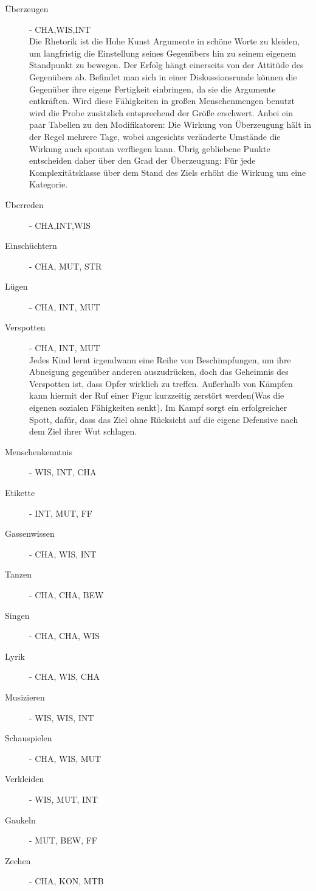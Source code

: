 \documentclass[a4paper,12pt,oneside]{book}
\begin{document}
\begin{description}
\item[Überzeugen]- CHA,WIS,INT
\\Die Rhetorik ist die Hohe Kunst Argumente in schöne Worte zu kleiden, um langfristig die Einstellung seines Gegenübers hin zu seinem eigenem Standpunkt zu bewegen. Der Erfolg hängt einerseits von der Attitüde des Gegenübers ab. Befindet man sich in einer Diskussionsrunde können die Gegenüber ihre eigene Fertigkeit einbringen, da sie die Argumente entkräften. Wird diese Fähigkeiten in großen Menschenmengen benutzt wird die Probe zusätzlich entsprechend der Größe erschwert. Anbei ein paar Tabellen zu den Modifikatoren:
Die Wirkung von Überzeugung hält in der Regel mehrere Tage, wobei angesichts veränderte Umstände die Wirkung auch spontan verfliegen kann. Übrig gebliebene Punkte entscheiden daher über den Grad der Überzeugung:
Für jede Komplexitätsklasse über dem Stand des Ziels erhöht die Wirkung um eine Kategorie.
\item[Überreden]- CHA,INT,WIS
\item[Einschüchtern]- CHA, MUT, STR
\item[Lügen]- CHA, INT, MUT
\item[Verspotten]- CHA, INT, MUT
\\Jedes Kind lernt irgendwann eine Reihe von Beschimpfungen, um ihre Abneigung gegenüber anderen auszudrücken, doch das Geheimnis des Verspotten ist, dass Opfer wirklich zu treffen. Außerhalb von Kämpfen kann hiermit der Ruf einer Figur kurzzeitig zerstört werden(Was die eigenen sozialen Fähigkeiten senkt). Im Kampf sorgt ein erfolgreicher Spott, dafür, dass das Ziel ohne Rücksicht auf die eigene Defensive nach dem Ziel ihrer Wut schlagen. 
\item[Menschenkenntnis]- WIS, INT, CHA
\item[Etikette]- INT, MUT, FF
\item[Gassenwissen]- CHA, WIS, INT
\item[Tanzen]- CHA, CHA, BEW 
\item[Singen]- CHA, CHA, WIS
\item[Lyrik]- CHA, WIS, CHA
\item[Musizieren] - WIS, WIS, INT 
\item[Schauspielen]- CHA, WIS, MUT
\item[Verkleiden]- WIS, MUT, INT
\item[Gaukeln]- MUT, BEW, FF
\item[Zechen]- CHA, KON, MTB
\end{description}
\end{document}

